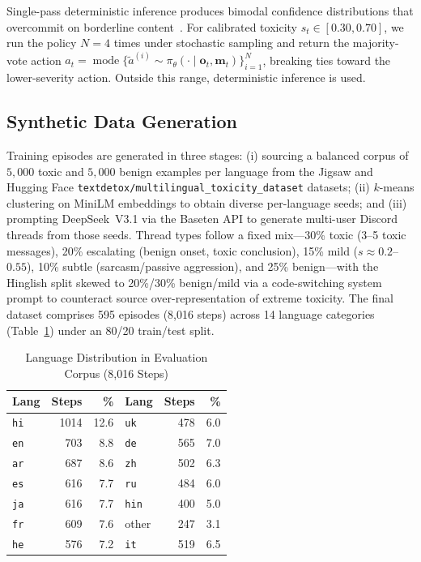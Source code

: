 \documentclass[journal]{IEEEtran}
\begin{document}
Single-pass deterministic inference produces bimodal confidence distributions that
overcommit on borderline content~\cite{liu2025meta}. For calibrated toxicity
$s_t \in [0.30, 0.70]$, we run the policy $N=4$ times under stochastic sampling and
return the majority-vote action $a_t = \operatorname{mode}\{\tilde{a}^{(i)}
\sim \pi_\theta(\cdot \mid \mathbf{o}_t, \mathbf{m}_t)\}_{i=1}^N$, breaking ties toward
the lower-severity action. Outside this range, deterministic inference is used.

\subsection{Synthetic Data Generation}

Training episodes are generated in three stages: (i) sourcing a balanced corpus of
$5{,}000$ toxic and $5{,}000$ benign examples per language from the Jigsaw
\cite{jigsaw} and Hugging Face \texttt{textdetox/multilingual\_toxicity\_dataset}
\cite{dementieva2023} datasets; (ii) $k$-means clustering on MiniLM embeddings to obtain
diverse per-language seeds; and (iii) prompting DeepSeek~V3.1 \cite{deepseek2024} via
the Baseten API to generate multi-user Discord threads from those seeds. Thread types
follow a fixed mix---30\% toxic (3--5 toxic messages), 20\% escalating (benign onset,
toxic conclusion), 15\% mild ($s \approx 0.2$--$0.55$), 10\% subtle (sarcasm/passive
aggression), and 25\% benign---with the Hinglish split skewed to 20\%/30\%
benign/mild via a code-switching system prompt to counteract source over-representation
of extreme toxicity. The final dataset comprises 595 episodes (8,016 steps) across 14
language categories (Table~\ref{tab:lang_dist}) under an 80/20 train/test split.

\begin{table}[!t]
  \renewcommand{\arraystretch}{1.3}
  \caption{Language Distribution in Evaluation Corpus (8,016 Steps)}
  \label{tab:lang_dist}
  \centering
  \begin{tabular}{lrr|lrr}
    \toprule
    Lang & Steps & \% & Lang & Steps & \% \\
    \midrule
    \texttt{hi}  & 1014 & 12.6 & \texttt{uk}  &  478 & 6.0 \\
    \texttt{en}  &  703 &  8.8 & \texttt{de}  &  565 & 7.0 \\
    \texttt{ar}  &  687 &  8.6 & \texttt{zh}  &  502 & 6.3 \\
    \texttt{es}  &  616 &  7.7 & \texttt{ru}  &  484 & 6.0 \\
    \texttt{ja}  &  616 &  7.7 & \texttt{hin} &  400 & 5.0 \\
    \texttt{fr}  &  609 &  7.6 & other        &  247 & 3.1 \\
    \texttt{he}  &  576 &  7.2 & \texttt{it}  &  519 & 6.5 \\
    \bottomrule
  \end{tabular}
\end{table}
\end{document}
